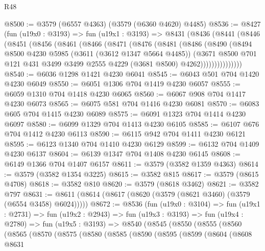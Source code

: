 \begin{lexlean}{R48}
\begin{coremodule}
@8500 := @3579 (@6557 @4363) (@3579 (@6360 @4620) @4485)
@8536 := @8427
    (fun (u19x0 : @3193) =>
    fun (u19x1 : @3193) =>
    @8431
      (@8436
        (@8441
          (@8446
            (@8451
              (@8456
                (@8461
                  (@8466
                    (@8471
                      (@8476
                        (@8481
                          (@8486
                            (@8490
                              (@8494
                                @8500
                                @4230
                                @5985
                                (@3611 (@3612 @1347 @5664 @4485))
                                (@3671
                                  @8500
                                  @701
                                  @121
                                  @431
                                  @3499
                                  @3499
                                  @2555
                                  @4229
                                  (@3681 @8500)
                                  @4262)))))))))))))))
@8540 := @6036 @1298 @1421 @4230 @6041
@8545 := @6043 @501 @704 @1420 @4230 @6049
@8550 := @6051 @1306 @704 @1419 @4230 @6057
@8555 := @6059 @1310 @704 @1418 @4230 @6065
@8560 := @6067 @908 @704 @1417 @4230 @6073
@8565 := @6075 @581 @704 @1416 @4230 @6081
@8570 := @6083 @605 @704 @1415 @4230 @6089
@8575 := @6091 @1323 @704 @1414 @4230 @6097
@8580 := @6099 @1329 @704 @1413 @4230 @6105
@8585 := @6107 @676 @704 @1412 @4230 @6113
@8590 := @6115 @942 @704 @1411 @4230 @6121
@8595 := @6123 @1340 @704 @1410 @4230 @6129
@8599 := @6132 @704 @1409 @4230 @6137
@8604 := @6139 @1347 @704 @1408 @4230 @6145
@8608 := @6149 @1366 @704 @1407 @6157
@8611 := @3579 (@3582 @1359 @4363)
@8614 := @3579 (@3582 @1354 @3225)
@8615 := @3582 @815
@8617 := @3579 (@8615 @4708)
@8618 := @3582 @810
@8620 := @3579 (@8618 @3462)
@8621 := @3582 @797
@8631 := @8611 (@8614 (@8617 (@8620 (@3579 (@8621 @3460) (@3579 (@6554 @3458) @6024)))))
@8672 := @8536
    (fun (u19x0 : @3104) =>
    fun (u19x1 : @2731) =>
    fun (u19x2 : @2943) =>
    fun (u19x3 : @3193) =>
    fun (u19x4 : @2780) =>
    fun (u19x5 : @3193) =>
    @8540
      (@8545
        (@8550
          (@8555
            (@8560
              (@8565
                (@8570
                  (@8575
                    (@8580
                      (@8585
                        (@8590
                          (@8595
                            (@8599
                              (@8604
                                (@8608
                                  @8631

\end{coremodule}
\end{lexlean}
